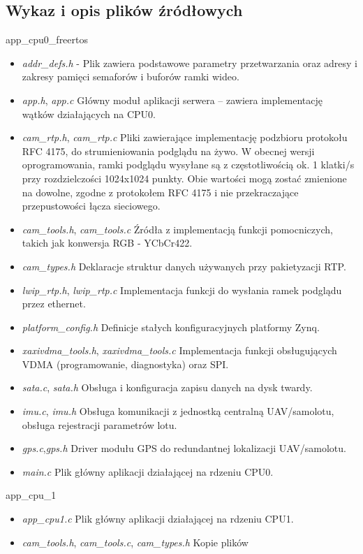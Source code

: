 \documentclass[a4paper,11pt,oneside]{report}  %
\begin{document}
\subsection{Wykaz i opis plików źródłowych}

app\_cpu0\_freertos
\begin{itemize}
\item \textit{addr\_defs.h} - Plik zawiera podstawowe parametry przetwarzania oraz adresy i zakresy pamięci semaforów i buforów ramki wideo.
\item \textit{app.h}, \textit{app.c} Główny moduł aplikacji serwera – zawiera implementację wątków działających na CPU0.
\item \textit{cam\_rtp.h}, \textit{cam\_rtp.c} Pliki zawierające implementację podzbioru protokołu RFC 4175, do strumieniowania podglądu na żywo. W obecnej wersji oprogramowania, ramki podglądu wysyłane są z częstotliwością ok. 1 klatki/s przy rozdzielczości 1024x1024 punkty. Obie wartości mogą zostać zmienione na dowolne, zgodne z protokołem RFC 4175 i nie przekraczające przepustowości łącza sieciowego.
\item \textit{cam\_tools.h}, \textit{cam\_tools.c} Źródła z implementacją funkcji pomocniczych, takich jak konwersja RGB - YCbCr422.
\item \textit{cam\_types.h} Deklaracje struktur danych używanych przy pakietyzacji RTP.
\item \textit{lwip\_rtp.h}, \textit{lwip\_rtp.c} Implementacja funkcji do wysłania ramek podglądu przez ethernet.
\item \textit{platform\_config.h} Definicje stałych konfiguracyjnych platformy Zynq.
\item \textit{xaxivdma\_tools.h}, \textit{xaxivdma\_tools.c} Implementacja funkcji obsługujących VDMA (programowanie, diagnostyka) oraz SPI.
\item \textit{sata.c}, \textit{sata.h} Obsługa i konfiguracja zapisu danych na dysk twardy.
\item \textit{imu.c}, \textit{imu.h} Obsługa komunikacji z jednostką centralną UAV/samolotu, obsługa rejestracji parametrów lotu.
\item \textit{gps.c},\textit{gps.h} Driver modułu GPS do redundantnej lokalizacji UAV/samolotu. 
\item \textit{main.c} Plik główny aplikacji działającej na rdzeniu CPU0.
\end{itemize}

app\_cpu\_1 

\begin{itemize}
\item \textit{app\_cpu1.c} Plik główny aplikacji działającej na rdzeniu CPU1.
\item \textit{cam\_tools.h}, \textit{cam\_tools.c}, \textit{cam\_types.h} Kopie plików
\end{itemize}
\end{document}
